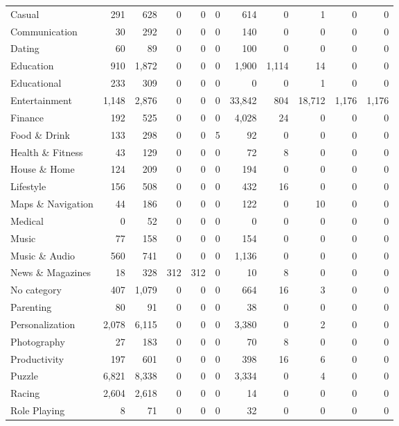 \documentclass[
A4paper,                %
twoside,                %
openright,              %
chapterprefix=true,     %
12pt,                   %
headings=normal,        %
titlepage=on            %
]{book}
\begin{document}
\begin{table}[p]
\begin{tabular}{lrrrrrrrrrr}
        Casual & 291 & 628 & 0 & 0 & 0 & 614 & 0 & 1 & 0 & 0 \\
        Communication & 30 & 292 & 0 & 0 & 0 & 140 & 0 & 0 & 0 & 0 \\
        Dating & 60 & 89 & 0 & 0 & 0 & 100 & 0 & 0 & 0 & 0 \\
        Education & 910 & 1,872 & 0 & 0 & 0 & 1,900 & 1,114 & 14 & 0 & 0 \\
        Educational & 233 & 309 & 0 & 0 & 0 & 0 & 0 & 1 & 0 & 0 \\
        Entertainment & 1,148 & 2,876 & 0 & 0 & 0 & 33,842 & 804 & 18,712 & 1,176 & 1,176 \\
        Finance & 192 & 525 & 0 & 0 & 0 & 4,028 & 24 & 0 & 0 & 0 \\
        Food \& Drink & 133 & 298 & 0 & 0 & 5 & 92 & 0 & 0 & 0 & 0 \\
        Health \& Fitness & 43 & 129 & 0 & 0 & 0 & 72 & 8 & 0 & 0 & 0 \\
        House \& Home & 124 & 209 & 0 & 0 & 0 & 194 & 0 & 0 & 0 & 0 \\
        Lifestyle & 156 & 508 & 0 & 0 & 0 & 432 & 16 & 0 & 0 & 0 \\
        Maps \& Navigation & 44 & 186 & 0 & 0 & 0 & 122 & 0 & 10 & 0 & 0 \\
        Medical & 0 & 52 & 0 & 0 & 0 & 0 & 0 & 0 & 0 & 0 \\
        Music & 77 & 158 & 0 & 0 & 0 & 154 & 0 & 0 & 0 & 0 \\
        Music \& Audio & 560 & 741 & 0 & 0 & 0 & 1,136 & 0 & 0 & 0 & 0 \\
        News \& Magazines & 18 & 328 & 312 & 312 & 0 & 10 & 8 & 0 & 0 & 0 \\
        No category & 407 & 1,079 & 0 & 0 & 0 & 664 & 16 & 3 & 0 & 0 \\
        Parenting & 80 & 91 & 0 & 0 & 0 & 38 & 0 & 0 & 0 & 0 \\
        Personalization & 2,078 & 6,115 & 0 & 0 & 0 & 3,380 & 0 & 2 & 0 & 0 \\
        Photography & 27 & 183 & 0 & 0 & 0 & 70 & 8 & 0 & 0 & 0 \\
        Productivity & 197 & 601 & 0 & 0 & 0 & 398 & 16 & 6 & 0 & 0 \\
        Puzzle & 6,821 & 8,338 & 0 & 0 & 0 & 3,334 & 0 & 4 & 0 & 0 \\
        Racing & 2,604 & 2,618 & 0 & 0 & 0 & 14 & 0 & 0 & 0 & 0 \\
        Role Playing & 8 & 71 & 0 & 0 & 0 & 32 & 0 & 0 & 0 & 0 \\

\end{tabular}
\end{table}
\end{document}

